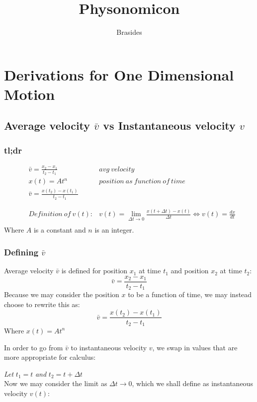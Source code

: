 \documentclass{article}
\title{Physonomicon}
\author{Brasides}
\numberwithin{equation}{section}
\begin{document}
\maketitle
\newpage
\tableofcontents

 \section{Derivations for One Dimensional Motion}
 \subsection{Average velocity $\bar{v}$ vs Instantaneous velocity $v$}
 \subsubsection{tl;dr}
 
\[
  \begin{aligned}
    &\bar{v} = \frac{x_2 - x_1}{t_2 - t_1} & avg\ velocity\\ 
    &x(t) = At^n & position\ as\ function\ of\ time \\ 
    & \bar{v} = \frac{x(t_2)-x(t_1)}{t_2 - t_1} & \\
    & & \\
    \hline{}\\
    & Definition\ of\ v(t):
    & v(t) = \lim_{\Delta t\to0} 
    \frac{x(t+\Delta t)-x(t)}{\Delta t}  
    \iff v(t) = \frac{dx}{dt}  \\
  \end{aligned}
\]
Where $A$ is a constant and $n$ is an integer.
 \subsubsection{Defining $\bar{v}$}
 Average velocity $\bar{v}$ is defined for position $x_1$ at time
 $t_1$ and position $x_2$ at time $t_2$:
 \[
   \bar{v} = \frac{x_2 - x_1}{t_2 - t_1}
\]
Because we may consider the position $x$ to be a function of time, we
may instead choose to rewrite this as:
 \[
    \bar{v} = \frac{x(t_2)-x(t_1)}{t_2 - t_1}
\]
Where $x(t) = At^{n} $
   
In order to go from $\bar{v}$ to instantaneous velocity $v$, we swap
in values that are more appropriate for calculus:\par 
\textit{Let }$t_1 = t$ \textit{ and } $t_2 = t+ \Delta t$\\
Now we may consider the limit as $\Delta t \to 0$, which we shall
define as instantaneous velocity $v(t)$:
 
\end{document}
